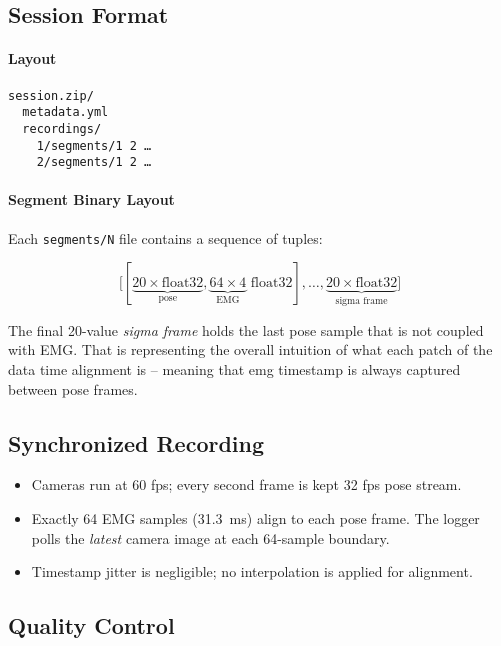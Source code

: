 \subsection{Session Format}

\paragraph{Layout}

\begin{verbatim}
session.zip/
  metadata.yml
  recordings/
    1/segments/1 2 …
    2/segments/1 2 …
\end{verbatim}

\paragraph{Segment Binary Layout}

Each \texttt{segments/N} file contains a sequence of tuples:

\[
\bigl[
  [\underbrace{20\! \times\! \text{float32}}_{\text{pose}},
   \underbrace{64\!\times\!4}_{\text{EMG}}\text{ float32}],
  \dots,
  \underbrace{20\! \times\! \text{float32}}_{\text{sigma frame}}
\bigr]
\]

The final 20-value \emph{sigma frame} holds the last pose sample that is not coupled with EMG. That is representing the overall intuition of what each patch of the data time alignment is -- meaning that emg timestamp is always captured between pose frames.

\subsection{Synchronized Recording}

\begin{itemize}
  \item Cameras run at 60 fps; every second frame is kept 32 fps pose stream.
  \item Exactly 64 EMG samples (\SI{31.3}{ms}) align to each pose frame. The
        logger polls the \emph{latest} camera image at each 64-sample boundary.
  \item Timestamp jitter is negligible; no interpolation is
        applied for alignment.
\end{itemize}

\subsection{Quality Control}

